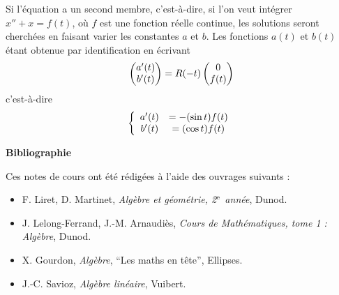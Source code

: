 \documentclass[class=report,crop=false]{standalone}
\begin{document}
\begin{exemple}
Si l'équation a un second membre, c'est-à-dire, si l'on veut intégrer $x''+x=f(t)$, où $f$ est une fonction réelle continue, les solutions seront cherchées en faisant varier les constantes $a$ et $b$. 
Les fonctions $a(t)$ et $b(t)$ étant obtenue par identification en écrivant
$$\left(\begin{matrix}a'(t)\cr b'(t)\end{matrix}\right)=R(-t)\left(\begin{matrix}0\cr f(t)\end{matrix}\right)$$
c'est-à-dire
$$\left\{\begin{array}{cc}a'(t)&=-(\sin t)f(t)\cr b'(t)&=(\cos t)f(t)\end{array}\right.$$
\end{exemple}


\textbf{Bibliographie}

Ces notes de cours ont été rédigées à l'aide des ouvrages suivants :
\begin{itemize}
  \item F. Liret, D. Martinet, \emph{Algèbre et géométrie, 2$^{\rm e}$ année}, Dunod.
  
  \item J. Lelong-Ferrand, J.-M. Arnaudiès, \emph{Cours de Mathématiques, tome 1 : Algèbre}, Dunod.
 
  \item X. Gourdon, \emph{Algèbre}, ``Les maths en tête'', Ellipses.
  
  \item J.-C. Savioz, \emph{Algèbre linéaire}, Vuibert.
\end{itemize}




\finchapitre 
\end{document}

